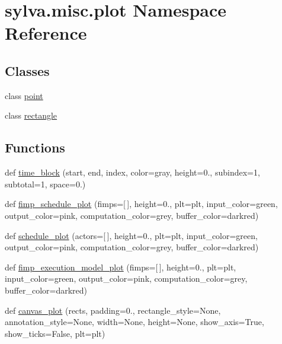 \hypertarget{namespacesylva_1_1misc_1_1plot}{}\section{sylva.\+misc.\+plot Namespace Reference}
\label{namespacesylva_1_1misc_1_1plot}
\subsection*{Classes}
\begin{DoxyCompactItemize}
\item 
class \hyperlink{classsylva_1_1misc_1_1plot_1_1point}{point}
\item 
class \hyperlink{classsylva_1_1misc_1_1plot_1_1rectangle}{rectangle}
\end{DoxyCompactItemize}
\subsection*{Functions}
\begin{DoxyCompactItemize}
\item 
def \hyperlink{namespacesylva_1_1misc_1_1plot_a39ec0e33c0b551cbb7d10d42e63bfa3d}{time\+\_\+block} (start, end, index, color=\textquotesingle{}gray\textquotesingle{}, height=0., subindex=1, subtotal=1, space=0.)
\item 
def \hyperlink{namespacesylva_1_1misc_1_1plot_a407cb01fd5820f94e98a438d04391c6e}{fimp\+\_\+schedule\+\_\+plot} (fimps=\mbox{[}$\,$\mbox{]}, height=0., plt=plt, input\+\_\+color=\textquotesingle{}green\textquotesingle{}, output\+\_\+color=\textquotesingle{}pink\textquotesingle{}, computation\+\_\+color=\textquotesingle{}grey\textquotesingle{}, buffer\+\_\+color=\textquotesingle{}darkred\textquotesingle{})
\item 
def \hyperlink{namespacesylva_1_1misc_1_1plot_a2937dd66c98822d9914353fc15105e14}{schedule\+\_\+plot} (actors=\mbox{[}$\,$\mbox{]}, height=0., plt=plt, input\+\_\+color=\textquotesingle{}green\textquotesingle{}, output\+\_\+color=\textquotesingle{}pink\textquotesingle{}, computation\+\_\+color=\textquotesingle{}grey\textquotesingle{}, buffer\+\_\+color=\textquotesingle{}darkred\textquotesingle{})
\item 
def \hyperlink{namespacesylva_1_1misc_1_1plot_a2e27375ca68228e819017903e39e39d9}{fimp\+\_\+execution\+\_\+model\+\_\+plot} (fimps=\mbox{[}$\,$\mbox{]}, height=0., plt=plt, input\+\_\+color=\textquotesingle{}green\textquotesingle{}, output\+\_\+color=\textquotesingle{}pink\textquotesingle{}, computation\+\_\+color=\textquotesingle{}grey\textquotesingle{}, buffer\+\_\+color=\textquotesingle{}darkred\textquotesingle{})
\item 
def \hyperlink{namespacesylva_1_1misc_1_1plot_a405ea3f626f2fbeea085e412f742ce68}{canvas\+\_\+plot} (rects, padding=0., rectangle\+\_\+style=None, annotation\+\_\+style=None, width=None, height=None, show\+\_\+axis=True, show\+\_\+ticks=False, plt=plt)
\end{DoxyCompactItemize}
